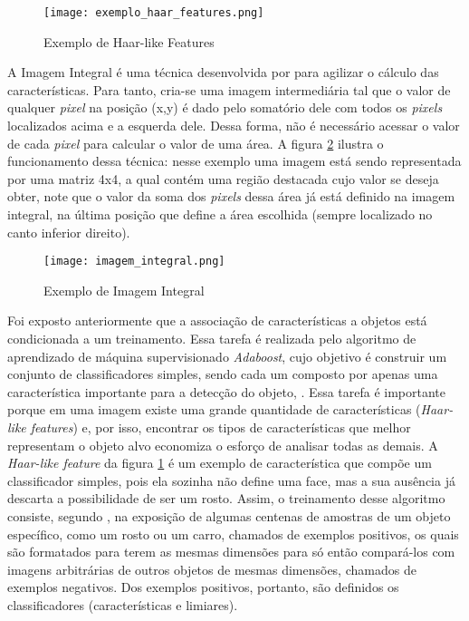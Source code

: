 \begin{figure}[!ht]
	\centering
	\texttt{[image: exemplo\_haar\_features.png]}   
	\caption{Exemplo de Haar-like Features}
	\label{fig:figura3}
\end{figure}

A Imagem Integral é uma técnica desenvolvida por \citep{Viola2001} para agilizar o cálculo das características. Para tanto, cria-se uma imagem intermediária tal que o valor de qualquer \textit{pixel} na posição (x,y) é dado pelo somatório dele com todos os \textit{pixels} localizados acima e a esquerda dele. Dessa forma, não é necessário acessar o valor de cada \textit{pixel} para calcular o valor de uma área. A figura \ref{fig:figura4} ilustra o funcionamento dessa técnica: nesse exemplo uma imagem está sendo representada por uma matriz 4x4, a qual contém uma região destacada cujo valor se deseja obter, note que o valor da soma dos \textit{pixels} dessa área já está definido na imagem integral, na última posição que define a área escolhida (sempre localizado no canto inferior direito).

\begin{figure}[!ht]
	\centering
	\texttt{[image: imagem\_integral.png]}   
	\caption{Exemplo de Imagem Integral}
	\label{fig:figura4}
\end{figure}

Foi exposto anteriormente que a associação de características a objetos está condicionada a um treinamento. Essa tarefa é realizada pelo algoritmo de aprendizado de máquina supervisionado \textit{Adaboost}, cujo objetivo é construir um conjunto de classificadores simples, sendo cada um composto por apenas uma característica importante para a detecção do objeto, \citep{Viola2001}. Essa tarefa é importante porque em uma imagem existe uma grande quantidade de características (\textit{Haar-like features}) e, por isso, encontrar os tipos de características que melhor representam o objeto alvo economiza o esforço de analisar todas as demais. A \textit{Haar-like feature} da figura \ref{fig:figura3} é um exemplo de característica que compõe um classificador simples, pois ela sozinha não define uma face, mas a sua ausência já descarta a possibilidade de ser um rosto. Assim, o treinamento desse algoritmo consiste, segundo \citep{open2018}, na exposição de algumas centenas de amostras de um objeto específico, como um rosto ou um carro, chamados de exemplos positivos, os quais são formatados para terem as mesmas dimensões para só então compará-los com imagens arbitrárias de outros objetos de mesmas dimensões, chamados de exemplos negativos. Dos exemplos positivos, portanto, são definidos os classificadores (características e limiares).

